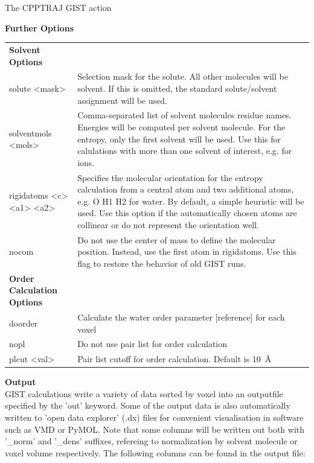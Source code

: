 \documentclass[9pt,tutorial]{livecoms}
\begin{document}
\begin{Checklists*}[h!]
\begin{checklist}{The CPPTRAJ GIST action}
	
\textbf{Further Options}\\
\begin{tabularx}{\textwidth}{@{} l X @{}}
\toprule

\textbf{Solvent Options} &\\
solute <mask> & Selection mask for the solute. All other molecules will be solvent. If this is omitted, the standard solute/solvent assignment will be used. \\
solventmols <mols> &Comma-separated list of solvent molecules residue names. Energies will be computed per solvent molecule. For the entropy, only the first solvent will be used. Use this for calulations with more than one solvent of interest, e.g. for  ions. \\
rigidatoms <c> <a1> <a2> & Specifies the molecular orientation for the entropy calculation from a central atom and two additional atoms, e.g. O H1 H2 for water. By default, a simple heuristic will be used.  
Use this option if the automatically chosen atoms are collinear or do not represent the orientation well. \\
nocom & Do not use the center of mass to define the molecular position. Instead, use the first atom in rigidatoms. Use this flag to restore the behavior of old GIST runs. \\
\textbf{Order Calculation Options} &\\
doorder & Calculate the water order parameter [reference] for each voxel\\
\qquad nopl & Do not use pair list for order calculation\\
\qquad plcut <val> & Pair list cutoff for order calculation. Default is \SI{10}{\angstrom}\\
\bottomrule
\end{tabularx}   
\medskip


\textbf{Output}\\
GIST calculations write a variety of data sorted by voxel into an outputfile specified by the 'out' keyword. 
Some of the output data is also automatically written to 'open data explorer' (.dx) files for convenient visualisation in software such as VMD or PyMOL. Note that some columns will be written out both with '\_norm' and '\_dens' suffixes, refereing to normalization by solvent molecule or voxel volume respectively.
The following columns can be found in the output file:
\medskip



\end{checklist}
\end{Checklists*}
\end{document}
